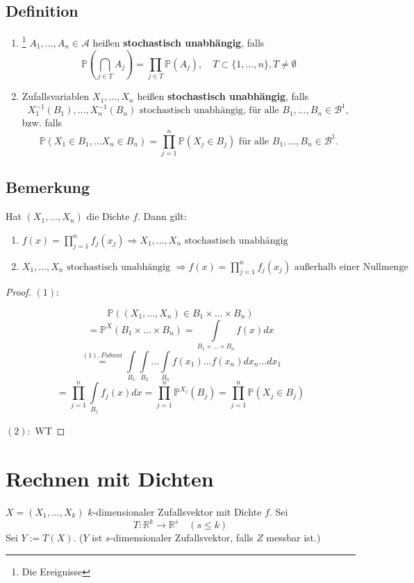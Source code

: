 \documentclass[a4paper,11pt,notitlepage]{report}
\newcommand{\R}{{\ensuremath{\mathbb{R}}}}
\newcommand{\Prim}{{\ensuremath{\mathbb{P}}}}
\begin{document}
\section{Definition}
\begin{enumerate}
	\item \footnote{Die Ereignisse} $A_1, \ldots, A_n \in \mathcal{A}$ heißen \textbf{stochastisch unabhängig}, falls 
	$$\Prim(\bigcap\limits_{j \in T}{A_j}) = \prod\limits_{j\in T}{}\Prim(A_j), \quad T \subset \{1, \ldots, n\}, T \neq \emptyset$$
	\item Zufallsvariablen $X_1, \ldots, X_n$ heißen \textbf{stochastisch unabhängig}, falls
	$$X_1^{-1}(B_1), \ldots, X_n^{-1}(B_n) \text{ stochastisch unabhängig, für alle } B_1, \ldots, B_n \in \mathcal{B}^1,$$
	bzw. falls
	$$\Prim(X_1 \in B_1, \ldots X_n \in B_n) = \prod\limits_{j=1}^n{\Prim(X_j \in B_j)} \text{ für alle } B_1, \ldots, B_n \in \mathcal{B}^1.$$
\end{enumerate}

\section{Bemerkung}
Hat $(X_1, \ldots, X_n)$ die Dichte $f$. Dann gilt:
\begin{enumerate}
\item $f(x) = \prod\limits_{j=1}^{n}{f_j(x_j)} \Rightarrow X_1, \ldots, X_n \text{ stochastisch unabhängig}$
\item $X_1, \ldots, X_n \text{ stochastisch unabhängig } \Rightarrow f(x) = \prod\limits_{j=1}^n{f_j(x_j)} \text{ außerhalb einer Nullmenge}$
\end{enumerate}


\begin{proof}
	$(1): $
	
	$$\Prim((X_1, \ldots, X_n) \in B_1 \times \ldots \times B_n)$$
	$$= \Prim^X(B_1 \times \ldots \times B_n) = \int\limits_{B_1 \times \ldots \times B_n}{f(x)dx}$$
	$$\overset{(1), Fubuni}{=} \int\limits_{B_1} \int\limits_{B_2} \ldots \int\limits_{B_n}{ f(x_1) \ldots f(x_n) dx_n \ldots dx_1}$$
	$$= \prod\limits_{j=1}^n{\int\limits_{B_j}{f_j(x)dx}} = \prod\limits_{j=1}^n{\Prim^{X_j}(B_j)} = \prod\limits_{j=1}^n{\Prim(X_j \in B_j)}$$
	
	$(2): $
	WT
\end{proof}

\chapter{Rechnen mit Dichten}
$X = (X_1, \ldots, X_k)$ $k$-dimensionaler Zufallsvektor mit Dichte $f$. Sei 
$$T \colon \R^k \rightarrow \R^s \quad (s \leq k)$$
Sei $Y := T(X)$.
($Y$ ist $s$-dimensionaler Zufallsvektor, falls $Z$ messbar ist.)
\end{document}
